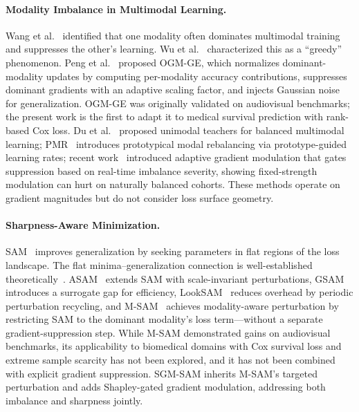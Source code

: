 \documentclass[10pt]{article}\usepackage[utf8]{inputenc}\usepackage[T1]{fontenc}\usepackage{amsmath,amssymb,amsfonts,bm}\usepackage{booktabs}\usepackage{multirow}\usepackage{array}\usepackage{graphicx}\usepackage{algorithm}\usepackage{algorithmic}\usepackage{xcolor}\usepackage[margin=1in]{geometry}\usepackage{microtype}
\begin{document}
\paragraph{Modality Imbalance in Multimodal Learning.} Wang et al.~\cite{wang2020hard} identified that one modality often dominates multimodal training and suppresses the other's learning. Wu et al.~\cite{wu2022greedy} characterized this as a ``greedy'' phenomenon. Peng et al.~\cite{peng2022balanced} proposed OGM-GE, which normalizes dominant-modality updates by computing per-modality accuracy contributions, suppresses dominant gradients with an adaptive scaling factor, and injects Gaussian noise for generalization. OGM-GE was originally validated on audiovisual benchmarks; the present work is the first to adapt it to medical survival prediction with rank-based Cox loss. Du et al.~\cite{du2023unimodal} proposed unimodal teachers for balanced multimodal learning; PMR~\cite{fan2023pmr} introduces prototypical modal rebalancing via prototype-guided learning rates; recent work~\cite{anonymous2026adaptive} introduced adaptive gradient modulation that gates suppression based on real-time imbalance severity, showing fixed-strength modulation can hurt on naturally balanced cohorts. These methods operate on gradient magnitudes but do not consider loss surface geometry.

\paragraph{Sharpness-Aware Minimization.} SAM~\cite{foret2021sam} improves generalization by seeking parameters in flat regions of the loss landscape. The flat minima--generalization connection is well-established theoretically~\cite{hochreiter1997flat,jiang2020fantastic,andriushchenko2023modern}. ASAM~\cite{kwon2021asam} extends SAM with scale-invariant perturbations, GSAM~\cite{zhuang2022gsam} introduces a surrogate gap for efficiency, LookSAM~\cite{liu2022looksam} reduces overhead by periodic perturbation recycling, and M-SAM~\cite{rajoli2025msam} achieves modality-aware perturbation by restricting SAM to the dominant modality's loss term---without a separate gradient-suppression step. While M-SAM demonstrated gains on audiovisual benchmarks, its applicability to biomedical domains with Cox survival loss and extreme sample scarcity has not been explored, and it has not been combined with explicit gradient suppression. SGM-SAM inherits M-SAM's targeted perturbation and adds Shapley-gated gradient modulation, addressing both imbalance and sharpness jointly.
\end{document}
